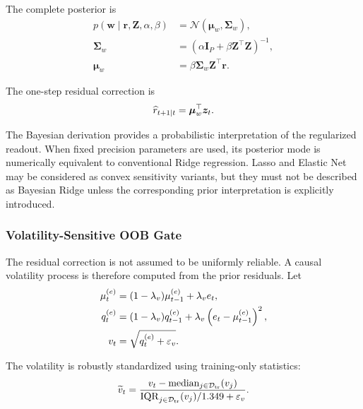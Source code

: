 \documentclass[review,number,sort&compress]{elsarticle}
\begin{document}
The complete posterior is
\begin{align}
    p(\bm{w}\mid\bm{r},\bm{Z},\alpha,\beta)
    &=
    \mathcal{N}
    \left(
    \bm{\mu}_w,
    \bm{\Sigma}_w
    \right),
    \\
    \bm{\Sigma}_w
    &=
    \left(
    \alpha\bm{I}_{P}
    +
    \beta\bm{Z}^\top\bm{Z}
    \right)^{-1},
    \\
    \bm{\mu}_w
    &=
    \beta
    \bm{\Sigma}_w
    \bm{Z}^\top\bm{r}.
\end{align}

The one-step residual correction is
\begin{equation}
    \widehat{r}_{t+1|t}
    =
    \bm{\mu}_w^\top\bm{z}_t.
    \label{eq:s3_raw_residual}
\end{equation}

The Bayesian derivation provides a probabilistic interpretation of the
regularized readout. When fixed precision parameters are used, its posterior
mode is numerically equivalent to conventional Ridge regression. Lasso and
Elastic Net may be considered as convex sensitivity variants, but they must not
be described as Bayesian Ridge unless the corresponding prior interpretation is
explicitly introduced.

\subsubsection{Volatility-Sensitive OOB Gate}

The residual correction is not assumed to be uniformly reliable. A causal
volatility process is therefore computed from the prior residuals. Let
\begin{align}
    \mu_t^{(e)}
    &=
    (1-\lambda_v)\mu_{t-1}^{(e)}
    +
    \lambda_v e_t,
    \\
    q_t^{(e)}
    &=
    (1-\lambda_v)q_{t-1}^{(e)}
    +
    \lambda_v
    \left(
    e_t-\mu_{t-1}^{(e)}
    \right)^2,
    \\
    v_t
    &=
    \sqrt{q_t^{(e)}+\varepsilon_v}.
    \label{eq:causal_volatility}
\end{align}

The volatility is robustly standardized using training-only statistics:
\begin{equation}
    \widetilde{v}_t
    =
    \frac{
        v_t-\operatorname{median}_{j\in\mathcal{D}_{\mathrm{tr}}}(v_j)
    }{
        \operatorname{IQR}_{j\in\mathcal{D}_{\mathrm{tr}}}(v_j)/1.349+\varepsilon_v
    }.
    \label{eq:volatility_standardization}
\end{equation}
\end{document}
